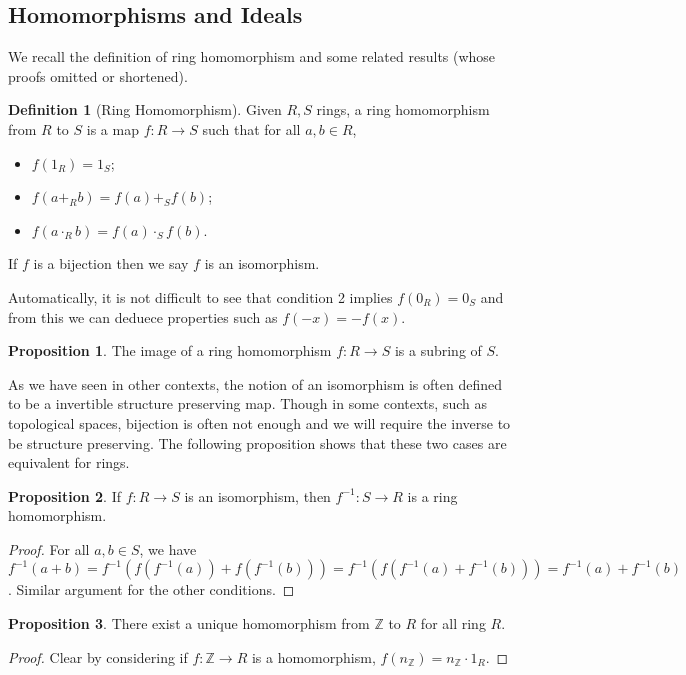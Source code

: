 \documentclass[]{article}
\theoremstyle{definition}
\theoremstyle{definition}
\newtheorem{definition}{Definition}[section]
\newtheorem{proposition}{Proposition}[section]
\begin{document}
\subsection{Homomorphisms and Ideals}

We recall the definition of ring homomorphism and some related results 
(whose proofs omitted or shortened).

\begin{definition}[Ring Homomorphism]
  Given \(R, S\) rings, a ring homomorphism from \(R\) to \(S\) is a map 
  \(f : R \to S\) such that for all \(a, b \in R\), 
  \begin{itemize}
    \item \(f(1_R) = 1_S\);
    \item \(f(a +_R b) = f(a) +_S f(b)\);
    \item \(f(a \cdot_R b) = f(a) \cdot_S f(b)\).
  \end{itemize}
  If \(f\) is a bijection then we say \(f\) is an isomorphism.
\end{definition}

Automatically, it is not difficult to see that condition 2 implies \(f(0_R) = 0_S\) 
and from this we can deduece properties such as \(f(-x) = -f(x)\).

\begin{proposition}
  The image of a ring homomorphism \(f : R \to S\) is a subring of \(S\).
\end{proposition}

As we have seen in other contexts, the notion of an isomorphism is often defined 
to be a invertible structure preserving map. Though in some contexts, such as 
topological spaces, bijection is often not enough and we will require the inverse 
to be structure preserving. The following proposition shows that these two 
cases are equivalent for rings.

\begin{proposition}
  If \(f : R \to S\) is an isomorphism, then \(f^{-1} : S \to R\) is a ring 
  homomorphism.
\end{proposition}
\begin{proof}
  For all \(a, b \in S\), we have \(f^{-1}(a + b) = 
  f^{-1}(f(f^{-1}(a)) + f(f^{-1}(b))) = f^{-1}(f(f^{-1}(a) + f^{-1}(b)))
  = f^{-1}(a) + f^{-1}(b)\). Similar argument for the other conditions.
\end{proof}

\begin{proposition}
  There exist a unique homomorphism from \(\mathbb{Z}\) to \(R\) for all ring 
  \(R\).
\end{proposition}
\begin{proof}
  Clear by considering if \(f : \mathbb{Z} \to R\) is a homomorphism, 
  \(f(n_{\mathbb{Z}}) = n_{\mathbb{Z}} \cdot 1_R\). 
\end{proof}
\end{document}

